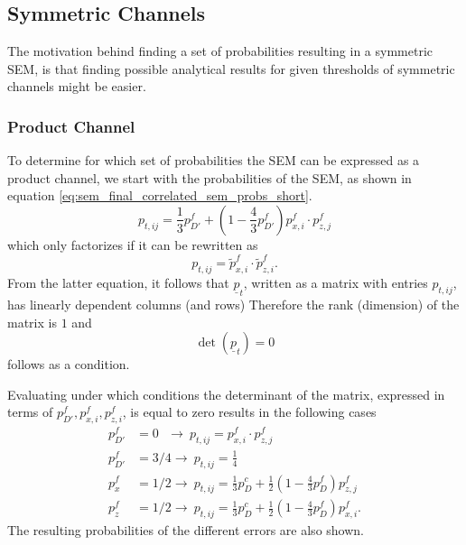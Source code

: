 \subsection{Symmetric Channels}\label{ssec:sem_fa_symmetric_channels}

The motivation behind finding a set of probabilities resulting in a symmetric SEM, 
is that finding possible analytical results for given thresholds of symmetric channels might be easier.

\subsubsection{Product Channel}

To determine for which set of probabilities the SEM can be expressed as a product channel, we start with the probabilities of the SEM, as shown in equation \eqref{eq:sem_final_correlated_sem_probs_short}.
\begin{equation}
    p_{t,ij} = \frac{1}{3} p_{D'}^f + \left( 1- \frac{4}{3} p_{D'}^f \right) p_{x,i}^f \cdot p_{z,j}^f 
\end{equation}
which only factorizes if it can be rewritten as
\begin{equation}
    p_{t,ij} = \tilde{p}_{x,i}^f \cdot \tilde{p}_{z,i}^f. 
\end{equation}
From the latter equation, it follows that $\underline{p}_t$, written as a matrix with entries $p_{t,ij}$, has linearly dependent columns (and rows)
Therefore the rank (dimension) of the matrix is $1$ and
\begin{equation}
    \det(\underline{p}_t) = 0
\end{equation}
follows as a condition.

Evaluating under which conditions the determinant of the matrix, expressed in terms of $p_{D'}^f,p_{x,i}^f, p_{z,i}^f$, is equal to zero
results in the following cases
\begin{align}
    p_{D'}^f &= 0 \ \ \ \rightarrow  \  p_{t,ij} =  p_{x,i}^f \cdot p_{z,j}^f\\
    p_{D'}^f &= 3/4 \rightarrow\   p_{t,ij} = \frac{1}{4} \\
    p_x^f &= 1/2 \rightarrow \  p_{t,ij} =  \frac{1}{3}p_D^c + \frac{1}{2}\left(1-\frac{4}{3}p_D^f\right)p_{z,j}^f\\
    p_z^f &= 1/2 \rightarrow \  p_{t,ij} =  \frac{1}{3}p_D^c + \frac{1}{2}\left(1-\frac{4}{3}p_D^f\right)p_{x,i}^f.
\end{align}
The resulting probabilities of the different errors are also shown. 

